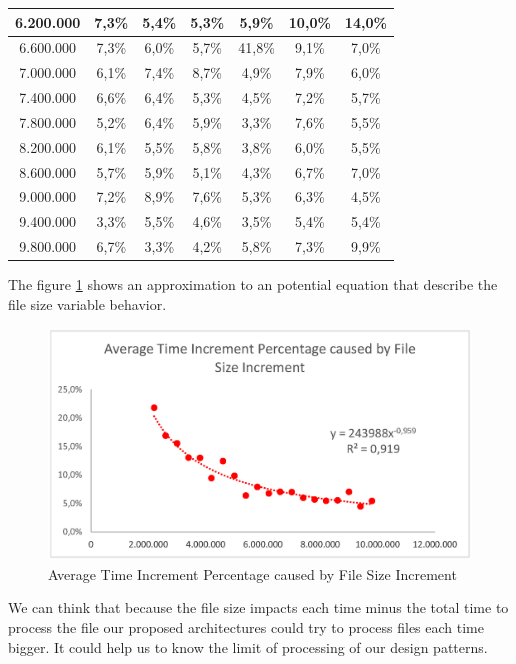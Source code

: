 \begin{table}[]
{\begin{tabular}{|c|c|c|c|c|c|c|}
				6.200.000 & 7,3\% & 5,4\% & 5,3\% & 5,9\% & 10,0\% & 14,0\% \\ \hline
				6.600.000 & 7,3\% & 6,0\% & 5,7\% & 41,8\% & 9,1\% & 7,0\% \\ \hline
				7.000.000 & 6,1\% & 7,4\% & 8,7\% & 4,9\% & 7,9\% & 6,0\% \\ \hline
				7.400.000 & 6,6\% & 6,4\% & 5,3\% & 4,5\% & 7,2\% & 5,7\% \\ \hline
				7.800.000 & 5,2\% & 6,4\% & 5,9\% & 3,3\% & 7,6\% & 5,5\% \\ \hline
				8.200.000 & 6,1\% & 5,5\% & 5,8\% & 3,8\% & 6,0\% & 5,5\% \\ \hline
				8.600.000 & 5,7\% & 5,9\% & 5,1\% & 4,3\% & 6,7\% & 7,0\% \\ \hline
				9.000.000 & 7,2\% & 8,9\% & 7,6\% & 5,3\% & 6,3\% & 4,5\% \\ \hline
				9.400.000 & 3,3\% & 5,5\% & 4,6\% & 3,5\% & 5,4\% & 5,4\% \\ \hline
				9.800.000 & 6,7\% & 3,3\% & 4,2\% & 5,8\% & 7,3\% & 9,9\% \\ \hline
			\end{tabular}%
		}
	\end{table}
	
	The figure \ref{fig:fileSize} shows an approximation to an potential equation that describe the file size variable behavior.
	
	\begin{figure}
		\centering
		\includegraphics[trim=0cm 8.5cm -1cm 10cm, scale=0.8]{fig/fileSize.eps}
		\caption{Average Time Increment Percentage caused by File Size Increment}
		\label{fig:fileSize}
	\end{figure}

We can think that because the file size impacts each time minus the total time to process the file our proposed architectures could try to process files each time bigger. It could help us to know the limit of processing of our design patterns.


